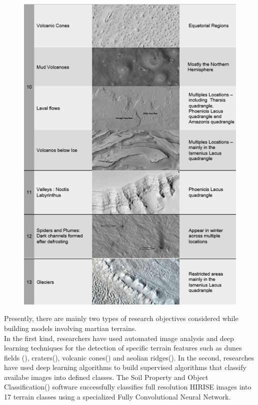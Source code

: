 \documentclass[project-plan]{report-template}
\begin{document}
\begin{figure}[htp]
    \begin{center}
        \includegraphics[width=1\textwidth]{table-1-part-3.png}
    \end{center}
\end{figure}

Presently, there are mainly two types of research objectives considered while building models involving martian terrains. \\
In the first kind, researchers have used automated image analysis and deep learning techniques for the detection of specific terrain features such as dunes fields (\citeauthor{5692810}), craters(\citeauthor{Lee_2019,palafox2015automated}), volcanic cones(\citeauthor{palafox2015automated}) and aeolian ridges(\citeauthor{palafox2017automated}). 
In the second, researches have used deep learning algorithms to build supervised algorithms that classify availabe images into defined classes. The Soil Property and Object Classification(\citeauthor{Rothrock2016SPOCDL}) software  successfully classifies full resolution HIRISE images into 17 terrain classes using a specialized Fully Convolutional Neural Network.
\end{document}
